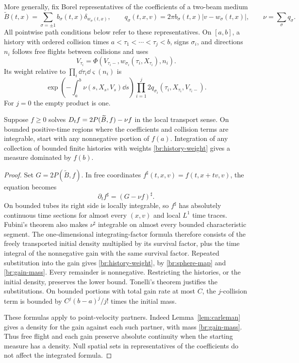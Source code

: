 More generally, fix Borel representatives of the coefficients of a
two-beam medium
\[
\widetilde B(t,x)=\sum_{\sigma=\pm1}b_\sigma(t,x)
                  \delta_{w_\sigma(t,x)},\qquad
q_\sigma(t,x,v)=2\pi b_\sigma(t,x)|v-w_\sigma(t,x)|,
\qquad \nu=\sum_\sigma q_\sigma.
\]
All pointwise path conditions below refer to these representatives.
On \([a,b]\), a history with ordered collision times
\(a<\tau_1<\cdots<\tau_j<b\), signs \(\sigma_i\), and directions \(n_i\)
follows free flights between collisions and uses
\[
V_{\tau_i}=\Phi(V_{\tau_i-},w_{\sigma_i}(\tau_i,X_{\tau_i}),n_i).
\]
Its weight relative to \(\prod_i\dd\tau_i\dd\varsigma(n_i)\) is
\begin{equation}\label{br:history-weight}
\exp\left(-\int_a^b\nu(s,X_s,V_s)\dd s\right)
\prod_{i=1}^j2q_{\sigma_i}(\tau_i,X_{\tau_i},V_{\tau_i-}).
\end{equation}
For \(j=0\) the empty product is one.

\begin{lemma}\label{br:positive-histories}
Suppose \(f\ge0\) solves
\(D_t f=2P(\widetilde B,f)-\nu f\) in the local transport sense.
On bounded positive-time regions where the coefficients and collision
terms are integrable, start with any nonnegative portion of \(f(a)\).
Integration of any collection of bounded finite histories with weights
\eqref{br:history-weight} gives a measure dominated by \(f(b)\).
\end{lemma}

\begin{proof}
Set \(G=2P(\widetilde B,f)\). In free coordinates
\(f^\sharp(t,x,v)=f(t,x+tv,v)\), the equation becomes
\[
\partial_t f^\sharp=(G-\nu f)^\sharp.
\]
On bounded tubes its right side is locally integrable, so \(f^\sharp\)
has absolutely continuous time sections for almost every \((x,v)\)
and local \(L^1\) time traces.
Fubini's theorem also makes \(\nu^\sharp\) integrable on almost every
bounded characteristic segment. The one-dimensional integrating-factor
formula therefore consists of the freely
transported initial density multiplied by its survival factor, plus the
time integral of the nonnegative gain with the same survival factor.
Repeated substitution into the gain gives \eqref{br:history-weight},
by \eqref{br:sphere-map} and \eqref{br:gain-mass}. Every remainder is
nonnegative. Restricting the histories, or the initial density, preserves
the lower bound. Tonelli's theorem justifies the substitutions. On bounded
portions with total gain rate at most \(C\), the \(j\)-collision term is
bounded by \(C^j(b-a)^j/j!\) times the initial mass.

These formulas apply to point-velocity partners. Indeed
Lemma~\ref{lem:carleman} gives a density for the gain against each such
partner, with mass \eqref{br:gain-mass}. Thus free flight and each gain
preserve absolute continuity when the starting measure has a density.
Null spatial sets in representatives of the coefficients do not affect
the integrated formula.
\end{proof}

